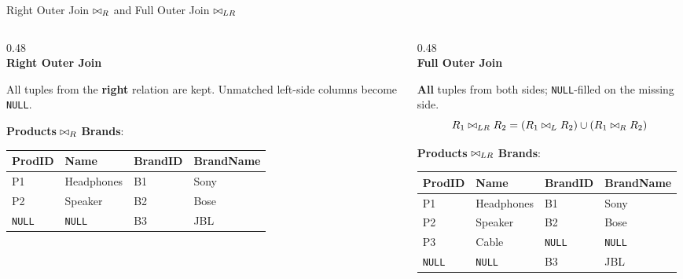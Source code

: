 \begin{frame}{Right Outer Join $\bowtie_R$ and Full Outer Join $\bowtie_{LR}$}
  \begin{columns}[T]
    \begin{column}{0.48\textwidth}
      \centering
      \\[4pt]
      \small \textbf{Right Outer Join}

      \vspace{4pt}
      \begin{block}{}
        All tuples from the \textbf{right} relation are kept.  Unmatched
        left-side columns become \texttt{NULL}.
      \end{block}

      \small
      \textbf{Products} $\bowtie_R$ \textbf{Brands}:
      \begin{tabular}{llll}
        \toprule
        ProdID & Name & BrandID & BrandName\\
        \midrule
        P1 & Headphones & B1 & Sony \\
        P2 & Speaker    & B2 & Bose \\
        \texttt{NULL} & \texttt{NULL} & B3 & JBL \\
        \bottomrule
      \end{tabular}
    \end{column}
    \begin{column}{0.48\textwidth}
      \centering
      \\[4pt]
      \small \textbf{Full Outer Join}

      \vspace{4pt}
      \begin{block}{}
        \textbf{All} tuples from both sides; \texttt{NULL}-filled on the
        missing side.
        \[
          R_1 \bowtie_{LR} R_2 = (R_1 \bowtie_L R_2) \cup (R_1 \bowtie_R R_2)
        \]
      \end{block}

      \small
      \textbf{Products} $\bowtie_{LR}$ \textbf{Brands}:
      \begin{tabular}{llll}
        \toprule
        ProdID & Name & BrandID & BrandName\\
        \midrule
        P1 & Headphones & B1 & Sony \\
        P2 & Speaker    & B2 & Bose \\
        P3 & Cable      & \texttt{NULL} & \texttt{NULL} \\
        \texttt{NULL} & \texttt{NULL} & B3 & JBL \\
        \bottomrule
      \end{tabular}
    \end{column}
  \end{columns}
\end{frame}

